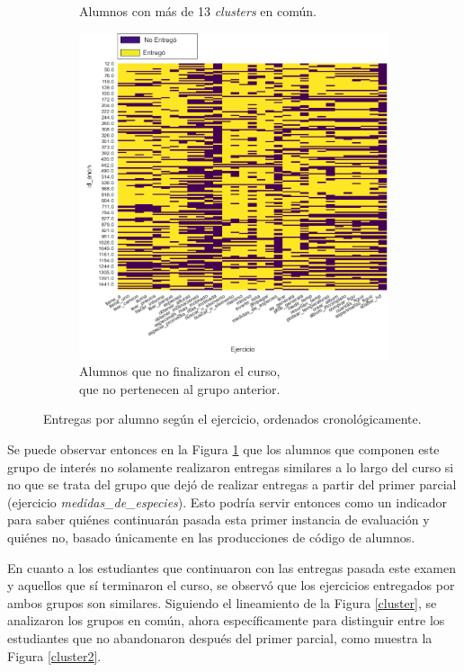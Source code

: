 \documentclass[11pt,a4paper,twoside,openany]{tesis}
\begin{document}
\begin{figure}[H]
\begin{subfigure}[t]{0.3\textwidth}
        \caption{Alumnos con más de 13 \emph{clusters} en común.}
        \label{fig:clique}
    \end{subfigure}
    \hfill
    \begin{subfigure}[t]{0.3\textwidth}
        \centering
        \includegraphics[width=\linewidth]{imagenes/entregas - no-clique13.png}
        \caption{Alumnos que no finalizaron el curso,\\que no pertenecen al grupo anterior.}
        \label{fig:noclique}
    \end{subfigure}
    \caption{Entregas por alumno según el ejercicio, ordenados cronológicamente.}
    \label{entregas}
\end{figure}

Se puede observar entonces en la Figura  \ref{fig:clique} que los alumnos que componen este grupo de interés no solamente realizaron entregas similares a lo largo del curso si no que se trata del grupo que dejó de realizar entregas a partir del primer parcial (ejercicio \emph{medidas\_de\_especies}). Esto podría servir entonces como un indicador para saber quiénes continuarán pasada esta primer instancia de evaluación y quiénes no, basado únicamente en las producciones de código de alumnos.

En cuanto a los estudiantes que continuaron con las entregas pasada este examen y aquellos que sí terminaron el curso, se observó que los ejercicios entregados por ambos grupos son similares. Siguiendo el lineamiento de la Figura \ref {cluster}, se analizaron los grupos en común, ahora específicamente para distinguir entre los estudiantes que no abandonaron después del primer parcial, como muestra la Figura \ref {cluster2}.
\end{document}
